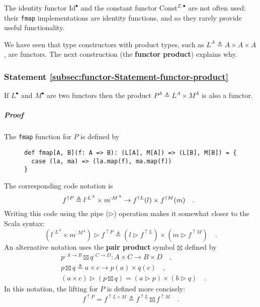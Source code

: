The identity functor $\text{Id}^{\bullet}$ and the constant functor
$\text{Const}^{Z,\bullet}$ are not often used: their \lstinline!fmap!
implementations are identity functions, and so they rarely provide
useful functionality. 

We have seen that type constructors with product types, such as $L^{A}\triangleq A\times A\times A$,
are functors. The next construction (the \textbf{functor
product}) explains why.

\subsubsection{Statement \label{subsec:functor-Statement-functor-product}\ref{subsec:functor-Statement-functor-product}}

If $L^{\bullet}$ and $M^{\bullet}$ are two functors then the product
$P^{A}\triangleq L^{A}\times M^{A}$ is also a functor.

\subparagraph{Proof}

The \lstinline!fmap! function for $P$ is defined by

\begin{wrapfigure}{l}{0.595\columnwidth}%
\vspace{-0.9\baselineskip}
\begin{lstlisting}
def fmap[A, B](f: A => B): (L[A], M[A]) => (L[B], M[B]) = {
  case (la, ma) => (la.map(f), ma.map(f))
}
\end{lstlisting}

\vspace{-1.5\baselineskip}
\end{wrapfigure}%

\noindent The corresponding code notation is
\[
\negthickspace\negthickspace f^{\uparrow P}\triangleq l^{:L^{A}}\times m^{:M^{A}}\rightarrow f^{\uparrow L}(l)\times f^{\uparrow M}(m)\quad.
\]
Writing this code using the pipe ($\triangleright$) operation makes
it somewhat closer to the Scala syntax:
\begin{equation}
(l^{:L^{A}}\times m^{:M^{A}})\triangleright f^{\uparrow P}\triangleq(l\triangleright f^{\uparrow L})\times(m\triangleright f^{\uparrow M})\quad.\label{eq:f-def-of-functor-product-lift}
\end{equation}
An alternative notation uses the \textbf{pair
product} symbol $\boxtimes$ defined by
\begin{align*}
 & p^{:A\rightarrow B}\boxtimes q^{:C\rightarrow D}:A\times C\rightarrow B\times D\quad,\\
 & p\boxtimes q\triangleq a\times c\rightarrow p(a)\times q(c)\quad,\\
 & (a\times c)\triangleright\left(p\boxtimes q\right)=\left(a\triangleright p\right)\times\left(b\triangleright q\right)\quad.
\end{align*}
In this notation, the lifting for $P$ is defined more concisely:
\begin{equation}
f^{\uparrow P}=f^{\uparrow L\times M}\triangleq f^{\uparrow L}\boxtimes f^{\uparrow M}\quad.\label{eq:def-of-functor-product-fmap}
\end{equation}

